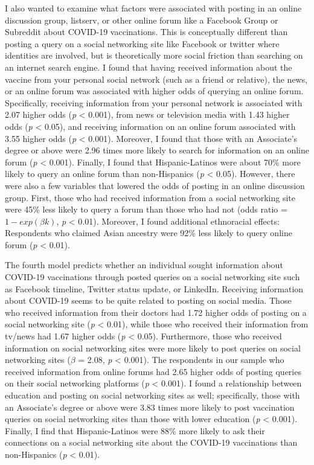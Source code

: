 I also wanted to examine what factors were associated with posting in an online discussion
group, listserv, or other online forum like a Facebook Group or Subreddit about
COVID-19 vaccinations. This is conceptually different than posting a query on a
social networking site like Facebook or twitter where identities are involved,
but is theoretically more social friction than searching on an internet
search engine. I found that having received information about the vaccine from
your personal social network (such as a friend or relative), the news, or an online
forum was associated with higher odds of querying an online forum. Specifically,
receiving information from your personal network is associated with 2.07
higher odds (\emph{p} \textless{} 0.001), from news or television media with 1.43 
higher odds (\emph{p} \textless{} 0.05), and receiving information on an online
forum associated with 3.55 higher odds (\emph{p} \textless{} 0.001). Moreover,
I found that those with an Associate's degree or above were 2.96 times more
likely to search for information on an online forum (\emph{p} \textless{} 0.001).
Finally, I found that Hispanic-Latinos were about 70\% more likely to query 
an online forum than non-Hispanics (\emph{p} \textless{} 0.05). However, 
there were also a few variables that lowered the odds of posting in an 
online discussion group. First, those who had received information from
a social networking site were 45\% less likely to query a forum than those 
who had not (odds ratio = \(1 - exp(\beta k)\), \emph{p} \textless{} 0.01).
Moreover, I found additional ethnoracial effects: Respondents who claimed
Asian ancestry were 92\% less likely to query online forum (\emph{p} \textless{} 0.01).

The fourth model predicts whether an individual sought information about
COVID-19 vaccinations through posted queries on a social networking site such
as Facebook timeline, Twitter status update, or LinkedIn. Receiving information
about COVID-19 seems to be quite related to posting on social media. Those who
received information from their doctors had 1.72 
higher odds of posting on a social networking site (\emph{p} \textless{} 0.01), while those
who received their information from tv/news had 1.67 higher odds (\emph{p} \textless{} 0.05).
Furthermore, those who received information on social networking sites were more
likely to post queries on social networking sites (\(\beta\) = 2.08, \emph{p} \textless{} 0.001).
The respondents in our sample who received information from online forums had 2.65
higher odds of posting queries on their social networking platforms (\emph{p} \textless{} 0.001).
I found a relationship between education and posting on social networking sites
as well; specifically, those with an Associate's degree or above were 3.83 times more likely to post vaccination
queries on social networking sites than those with lower education (\emph{p} \textless{} 0.001).
Finally, I find that Hispanic-Latinos were 88\%
more likely to ask their connections on a social networking site about the
COVID-19 vaccinations than non-Hispanics (\emph{p} \textless{} 0.01).

